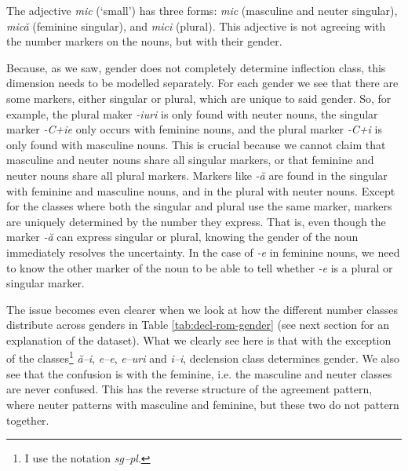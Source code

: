 The adjective \textit{mic} (`small') has three forms: \textit{mic} (masculine and neuter singular), \textit{mică} (feminine singular), and \textit{mici} (plural). This adjective is not agreeing with the number markers on the nouns, but with their gender.

Because, as we saw, gender does not completely determine inflection class, this dimension needs to be modelled separately. For each gender we see that there are some markers, either singular or plural, which are unique to said gender. So, for example, the plural maker \textit{-iuri} is only found with neuter nouns, the singular marker \textit{-C+ie} only occurs with feminine nouns, and the plural marker \textit{-C+i} is only found with masculine nouns. This is crucial because we cannot claim that masculine and neuter nouns share all singular markers, or that feminine and neuter nouns share all plural markers. Markers like \textit{-ă} are found in the singular with feminine and masculine nouns, and in the plural with neuter nouns. Except for the classes where both the singular and plural use the same marker, markers are uniquely determined by the number they express. That is, even though the marker \textit{-ă} can express singular or plural, knowing the gender of the noun immediately resolves the uncertainty. In the case of \textit{-e} in feminine nouns, we need to know the other marker of the noun to be able to tell whether \textit{-e} is a plural or singular marker.

The issue becomes even clearer when we look at how the different number classes distribute across genders in Table \ref{tab:decl-rom-gender} (see next section for an explanation of the dataset). What we clearly see here is that with the exception of the classes\footnote{I use the notation \textit{sg--pl}.} \textit{ă--i}, \textit{e--e}, \textit{e--uri} and \textit{i--i}, declension class determines gender. We also see that the confusion is with the feminine, i.e. the masculine and neuter classes are never confused. This has the reverse structure of the agreement pattern, where neuter patterns with masculine and feminine, but these two do not pattern together.

